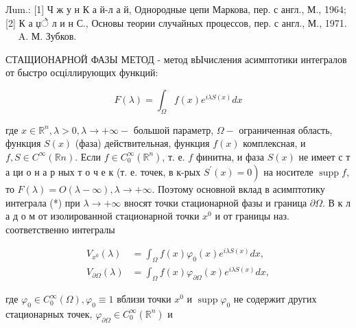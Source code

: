 \documentclass[10pt]{article}
\begin{document}
Лum.: [1] Ч ж у н К а й-л а й, Однородные цепи Маркова, пер. с англ., М., 1964; [2] К а џे л и н С., Основы теории случайных процессов, пер. с англ., М., 1971. $\quad$ A. М. Зубков.



СТАЩИОНАРНОЙ ФАЗЫ МЕТОД - метод вЫчисления асимптотики интегралов от быстро осціллирующих функций:



\[

F(\lambda)=\int_{\Omega} f(x) e^{i \lambda S(x)} d x

\]



где $x \in \mathbb{R}^{n}, \lambda>0, \lambda \rightarrow+\infty-$ большой параметр, $\Omega-$ ограниченная область, функция $S(x)$ (фаза) действительная, функция $f(x)$ комплексная, и $f, S \in C^{\infty}(\mathbb{R} n)$. Если $f \in C_{0}^{\infty}\left(\mathbb{R}^{n}\right)$, т. е. $f$ финитна, и фаза $S(x)$ не имеет с т а ци о н а р ных т о ч е к (т. е. точек, в к-рых $\left.S^{\prime}(x)=0\right)$ на носителе $\operatorname{supp} f$, то $F(\lambda)=O(\lambda-\infty), \lambda \rightarrow+\infty$. Поэтому основной вклад в асимптотику интеграла (*) при $\lambda \rightarrow+\infty$ вносят точки стационарной фазы и граница $\partial \Omega$. В к л а д о м от изолированной стационарной точки $x^{0}$ и от границы наз. соответственно интегралы



\[

\begin{aligned}

V_{x^{0}}(\lambda) & =\int_{\Omega} f(x) \varphi_{0}(x) e^{i \lambda S(x)} d x, \\

V_{\partial \Omega}(\lambda) & =\int_{\Omega} f(x) \varphi_{\partial \Omega}(x) e^{i \lambda S(x)} d x,

\end{aligned}

\]



где $\varphi_{0} \in C_{0}^{\infty}(\Omega), \varphi_{0} \equiv 1$ вблизи точки $x^{0}$ и $\operatorname{supp} \varphi_{0}$ не содержит других стационарных точек, $\varphi_{\partial \Omega} \in C_{0}^{\infty}\left(\mathbb{R}^{n}\right)$ и
\end{document}
